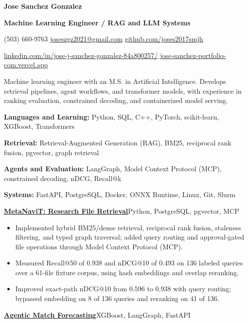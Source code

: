 \documentclass[letterpaper,10pt]{article}
\newcommand{\resumeSection}[1]{\par\vspace{7pt}{\large\bfseries #1}\par\vspace{3pt}}
\newcommand{\project}[3]{\par\vspace{3pt}\textbf{\href{#2}{#1}}\enspace\textbar\enspace #3\par}
\newcommand{\resumeItem}[1]{\item #1}
\begin{document}
{\fontsize{22}{25}\selectfont\bfseries Jose Sanchez Gonzalez}\par
\vspace{2pt}
\textbf{Machine Learning Engineer / RAG and LLM Systems}\par
\vspace{3pt}
{\fontsize{9}{10.5}\selectfont
(503) 660-9763\enspace\textbar\enspace
\href{mailto:joseszgz2021@gmail.com}{joseszgz2021@gmail.com}\enspace\textbar\enspace
\href{https://github.com/joses2017smjh}{github.com/joses2017smjh}\par
\href{https://linkedin.com/in/jose-j-sanchez-gonzalez-84a800257/}{linkedin.com/in/jose-j-sanchez-gonzalez-84a800257/}\enspace\textbar\enspace
\href{https://jose-sanchez-portfolio-com.vercel.app/}{jose-sanchez-portfolio-com.vercel.app}\par}
\resumeSection{Summary}
Machine learning engineer with an M.S. in Artificial Intelligence. Develops retrieval pipelines, agent workflows, and transformer models, with experience in ranking evaluation, constrained decoding, and containerized model serving.
\resumeSection{Technical Skills}
\textbf{Languages and Learning:} Python, SQL, C++, PyTorch, scikit-learn, XGBoost, Transformers\par
\textbf{Retrieval:} Retrieval-Augmented Generation (RAG), BM25, reciprocal rank fusion, pgvector, graph retrieval\par
\textbf{Agents and Evaluation:} LangGraph, Model Context Protocol (MCP), constrained decoding, nDCG, Recall@k\par
\textbf{Systems:} FastAPI, PostgreSQL, Docker, ONNX Runtime, Linux, Git, Slurm\par
\resumeSection{Projects}
\project{MetaNaviT: Research File Retrieval}{https://github.com/joses2017smjh/MetaNavT}{Python, PostgreSQL, pgvector, MCP}
\begin{itemize}
\resumeItem{Implemented hybrid BM25/dense retrieval, reciprocal rank fusion, staleness filtering, and typed graph traversal; added query routing and approval-gated file operations through Model Context Protocol (MCP).}
\resumeItem{Measured Recall@50 of 0.938 and nDCG@10 of 0.493 on 136 labeled queries over a 61-file fixture corpus, using hash embeddings and overlap reranking.}
\resumeItem{Improved exact-path nDCG@10 from 0.596 to 0.938 with query routing; bypassed embedding on 8 of 136 queries and reranking on 41 of 136.}
\end{itemize}
\project{Agentic Match Forecasting}{https://github.com/joses2017smjh/Agentic-Soccer-Match-Prediction-MCP}{XGBoost, LangGraph, FastAPI}
\end{document}
